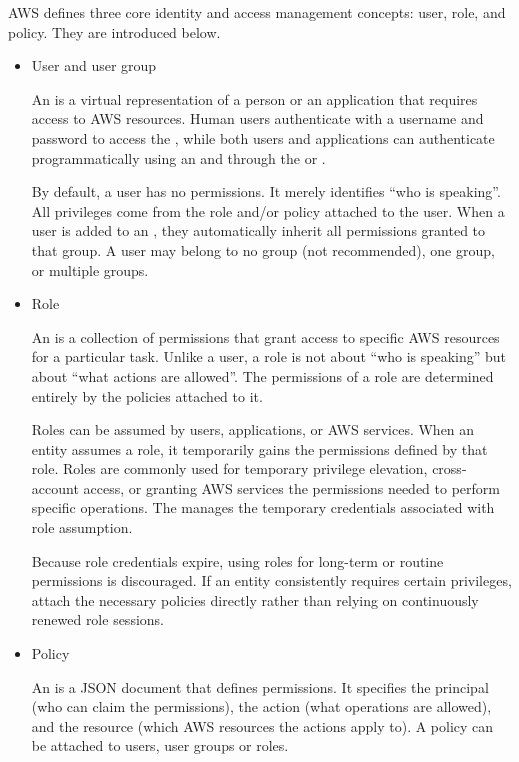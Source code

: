 AWS defines three core identity and access management concepts: user, role, and policy. They are introduced below.
\begin{itemize}
	
	\item User and user group
	
	An  is a virtual representation of a person or an application that requires access to AWS resources. Human users authenticate with a username and password to access the , while both users and applications can authenticate programmatically using an  and  through the  or .
	
	By default, a user has no permissions. It merely identifies ``who is speaking''. All privileges come from the role and/or policy attached to the user. When a user is added to an , they automatically inherit all permissions granted to that group. A user may belong to no group (not recommended), one group, or multiple groups.
	
	\item Role
	
	An  is a collection of permissions that grant access to specific AWS resources for a particular task. Unlike a user, a role is not about ``who is speaking'' but about ``what actions are allowed''. The permissions of a role are determined entirely by the policies attached to it.
	
	Roles can be assumed by users, applications, or AWS services. When an entity assumes a role, it temporarily gains the permissions defined by that role. Roles are commonly used for temporary privilege elevation, cross-account access, or granting AWS services the permissions needed to perform specific operations. The  manages the temporary credentials associated with role assumption.
	
	Because role credentials expire, using roles for long-term or routine permissions is discouraged. If an entity consistently requires certain privileges, attach the necessary policies directly rather than relying on continuously renewed role sessions.
	
	\item Policy
	
	An  is a JSON document that defines permissions. It specifies the principal (who can claim the permissions), the action (what operations are allowed), and the resource (which AWS resources the actions apply to). A policy can be attached to users, user groups or roles.
	

\end{itemize}
